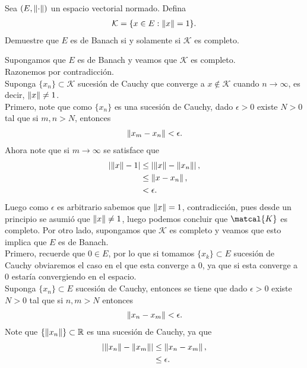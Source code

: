 \begin{homeworkProblem}
  Sea $(E,\left\|\cdot\right\|)$ un espacio vectorial normado. Defina
  \begin{align*}
    \mathcal{K}=\{x\in E:\left\|x\right\|=1\}.
  \end{align*}
  Demuestre que $E$ es de Banach si y solamente si $\mathcal{K}$ es completo. 
  \begin{solution}
    Supongamos que $E$ es de Banach y veamos que $\mathcal{K}$ es completo.\\
    Razonemos por contradicción.\\
    Suponga $\{x_n\}\subset \mathcal{K}$ sucesión de Cauchy que converge a $x\notin \mathcal{K}$ cuando $n\to\infty$, es decir, $\left\|x\right\|\neq 1$.\\
    Primero, note que como $\{x_n\}$ es una sucesión de Cauchy, dado $\epsilon>0$ existe $N>0$ tal que si $m,n>N$, entonces 
    \begin{align*}
      \left\|x_m-x_n\right\|<\epsilon.
    \end{align*}
    Ahora note que si $m\to\infty$ se satisface que 
    \begin{align*}
      \left| \left\|x\right\|-1 \right|&\leq\left| \left\|x\right\|-\left\|x_n\right\| \right|,\\
      &\leq\left\|x-x_n\right\|,\\
      &< \epsilon.
    \end{align*}
    Luego como $\epsilon$ es arbitrario sabemos que $\left\|x\right\|=1$, contradicción, pues desde un principio se asumió que $\left\|x\right\|\neq 1$, luego podemos concluir que $\matcal{K}$ es completo. 
    Por otro lado, supongamos que $\mathcal{K}$ es completo y veamos que esto implica que $E$ es de Banach.\\
    Primero, recuerde que $0\in E$, por lo que si tomamos $\{x_k\}\subset E$ sucesión de Cauchy obviaremos el caso en el que esta converge a $0$, ya que si esta converge a $0$ estaría convergiendo en el espacio.\\ 
    Suponga $\{x_n\}\subset E$ sucesión de Cauchy, entonces se tiene que dado $\epsilon>0$ existe $N>0$ tal que si $n,m>N$ entonces
    \begin{align*}
      \left\|x_n-x_m\right\|<\epsilon.
    \end{align*}
    Note que $\{\left\|x_n\right\|\}\subset \mathbb{R}$ es una sucesión de Cauchy, ya que
    \begin{align*}
      \left| \left\|x_n\right\|-\left\|x_m\right\| \right|&\leq \left\|x_n-x_m\right\|,\\
      &\leq \epsilon.
    \end{align*}

\end{solution}
\end{homeworkProblem}
